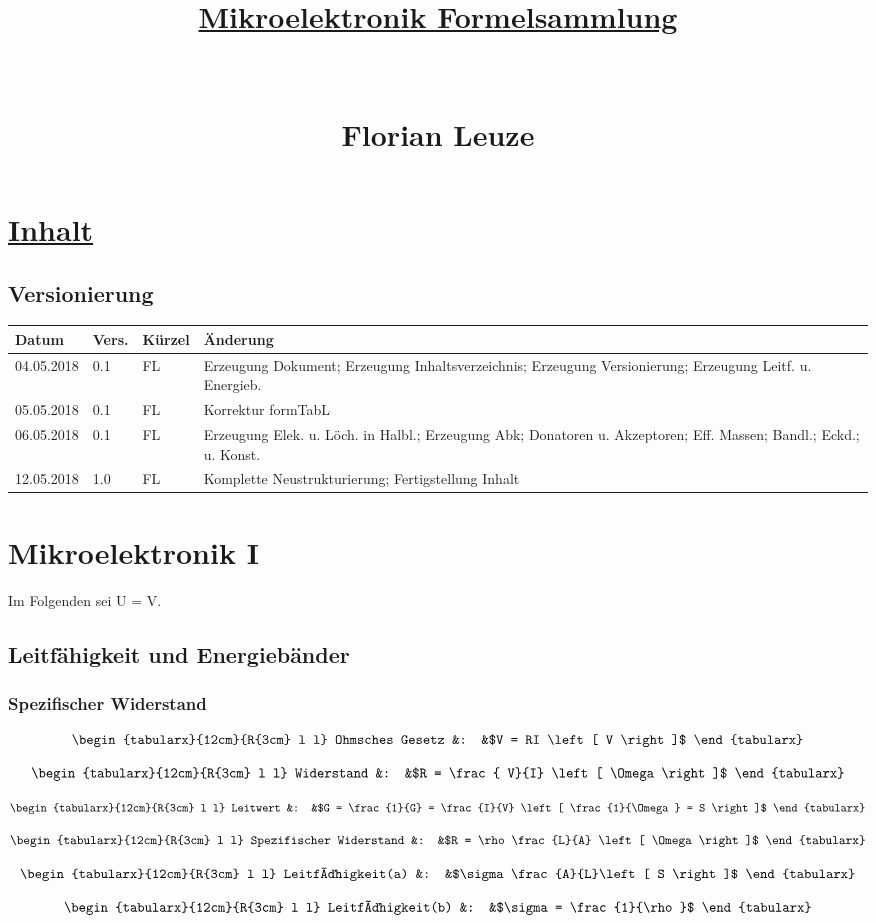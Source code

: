 \documentclass[12pt,a4paper]{article}%
\numberwithin{equation}{section}
\def\bracks#1{\left[ #1 \right]}
\newcommand{\formTabL}[3]{
\begin{equation}
  \begin{tabularx}{12cm}{R{3cm} l l}
    #1 &: &$#2$ 
  \end{tabularx}
  \label{eq:#3}
\end{equation}}
\numberwithin{equation}{subsection}
\begin{document}


\author{}
\title{\underline{Mikroelektronik Formelsammlung} \\ $\;$ \\ $\;$ \\ Florian Leuze}
\date{}

\maketitle %
\newpage
\section{\underline{Inhalt}}
\tableofcontents

  \subsection{Versionierung}
  \begin{tabular}{|p{2cm}|p{1cm}|p{1.5cm}|p{8.5cm}|}\hline
    Datum & Vers. & Kürzel & Änderung \\ \hline
    04.05.2018 & 0.1 & FL & Erzeugung Dokument; Erzeugung Inhaltsverzeichnis; Erzeugung Versionierung; Erzeugung Leitf. u. Energieb.\\ \hline
    05.05.2018 & 0.1 & FL & Korrektur formTabL \\ \hline
    06.05.2018 & 0.1 & FL & Erzeugung Elek. u. Löch. in Halbl.; Erzeugung Abk; Donatoren u. Akzeptoren; Eff. Massen; Bandl.; Eckd.; u. Konst. \\ \hline
    12.05.2018 & 1.0 & FL & Komplette Neustrukturierung; Fertigstellung Inhalt\\ \hline
  \end{tabular}
  
  
\newpage
\section{Mikroelektronik I}
Im Folgenden sei U = V.
  \subsection{Leitfähigkeit und Energiebänder}
  \subsubsection{Spezifischer Widerstand}
  \formTabL{Ohmsches Gesetz}{V = RI \bracks{V}}{ohms_law_V}
  \formTabL{Widerstand}{R = \frac{ V}{I} \bracks{\Omega}}{ohms_law_R}
  \formTabL{Leitwert}{G = \frac{1}{G} = \frac{I}{V} \bracks{\frac{1}{\Omega} = S}}{leitwert}
  \formTabL{Spezifischer Widerstand}{R = \rho \frac{L}{A} \bracks{\Omega}}{spezR}
  \formTabL{Leitfähigkeit(a)}{\sigma \frac{A}{L}\bracks{S}}{leitf_a}
  \formTabL{Leitfähigkeit(b)}{\sigma = \frac{1}{\rho}}{leitf_b}
  
\end{document}
